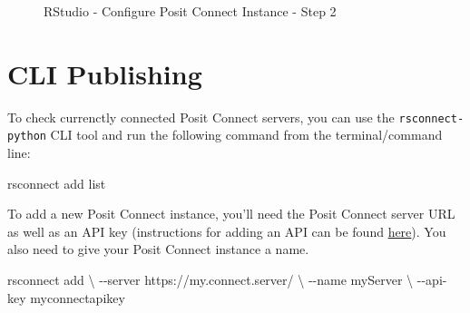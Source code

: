 \documentclass[
  letterpaper,
  DIV=11,
  numbers=noendperiod]{scrreprt}
\newenvironment{Shaded}{\begin{snugshade}}{\end{snugshade}}
\newcommand{\AttributeTok}[1]{\textcolor[rgb]{0.40,0.45,0.13}{#1}}
\newcommand{\DataTypeTok}[1]{\textcolor[rgb]{0.68,0.00,0.00}{#1}}
\newcommand{\ExtensionTok}[1]{\textcolor[rgb]{0.00,0.23,0.31}{#1}}
\newcommand{\NormalTok}[1]{\textcolor[rgb]{0.00,0.23,0.31}{#1}}
\begin{document}
\begin{figure}


\caption{\label{fig-rstudio-connect2}RStudio - Configure Posit Connect
Instance - Step 2}

\end{figure}%

\section{CLI Publishing}\label{cli-publishing}

To check currenctly connected Posit Connect servers, you can use the
\texttt{rsconnect-python} CLI tool and run the following command from
the terminal/command line:

\begin{Shaded}
\begin{Highlighting}[]
\ExtensionTok{rsconnect}\NormalTok{ add list }
\end{Highlighting}
\end{Shaded}

To add a new Posit Connect instance, you'll need the Posit Connect
server URL as well as an API key (instructions for adding an API can be
found \href{https://docs.posit.co/connect/user/api-keys/}{here}). You
also need to give your Posit Connect instance a name.

\begin{Shaded}
\begin{Highlighting}[]
\ExtensionTok{rsconnect}\NormalTok{ add }\DataTypeTok{\textbackslash{}}
    \AttributeTok{{-}{-}server}\NormalTok{ https://my.connect.server/ }\DataTypeTok{\textbackslash{}}
    \AttributeTok{{-}{-}name}\NormalTok{ myServer }\DataTypeTok{\textbackslash{}}
    \AttributeTok{{-}{-}api{-}key}\NormalTok{ myconnectapikey}
\end{Highlighting}
\end{Shaded}
\end{document}
